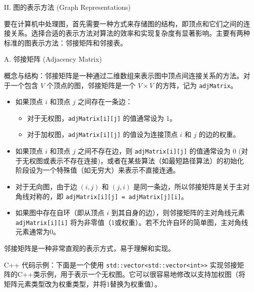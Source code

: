 II. 图的表示方法 (Graph Representations)

要在计算机中处理图，首先需要一种方式来存储图的结构，即顶点和它们之间的连接关系。选择合适的表示方法对算法的效率和实现复杂度有显著影响。主要有两种标准的图表示方法：邻接矩阵和邻接表。

A. 邻接矩阵 (Adjacency Matrix)

概念与结构：邻接矩阵是一种通过二维数组来表示图中顶点间连接关系的方法。对于一个包含 $V$ 个顶点的图，邻接矩阵是一个 $V \times V$ 的方阵，记为 \lstinline{adjMatrix}。

\begin{itemize}
	\item 如果顶点 $i$ 和顶点 $j$ 之间存在一条边：
	\begin{itemize}
		\item 对于无权图，\lstinline{adjMatrix[i][j]} 的值通常设为 1。
		\item 对于加权图，\lstinline{adjMatrix[i][j]} 的值设为连接顶点 $i$ 和 $j$ 的边的权重。
	\end{itemize}
	\item 如果顶点 $i$ 和顶点 $j$ 之间不存在边，则 \lstinline{adjMatrix[i][j]} 的值通常设为 0 (对于无权图或表示不存在连接)，或者在某些算法（如最短路径算法）的初始化阶段设为一个特殊值（如无穷大）来表示不直接连通。
	\item 对于无向图，由于边 $(i,j)$ 和 $(j,i)$ 是同一条边，所以邻接矩阵是关于主对角线对称的，即 \lstinline{adjMatrix[i][j] = adjMatrix[j][i]}。
	\item 如果图中存在自环（即从顶点 $i$ 到其自身的边），则邻接矩阵的主对角线元素 \lstinline{adjMatrix[i][i]} 将为非零值（1或权重）。若不允许自环的简单图，主对角线元素通常为0。
\end{itemize}

邻接矩阵是一种非常直观的表示方式，易于理解和实现。

C++ 代码示例：下面是一个使用 \lstinline{std::vector<std::vector<int>>} 实现邻接矩阵的C++类示例，用于表示一个无权图。它可以很容易地修改以支持加权图（将矩阵元素类型改为权重类型，并将1替换为权重值）。

